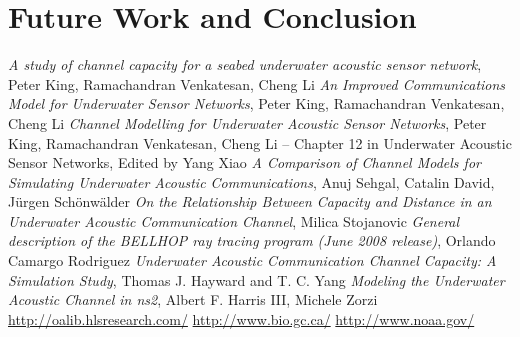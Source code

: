 \documentclass[a4paper]{IEEEtran}
\begin{document}
\section{Future Work and Conclusion}

\begin{thebibliography}{99}
 \textit{A study of channel capacity for a seabed underwater
acoustic sensor network}, Peter King, Ramachandran Venkatesan, Cheng Li
 \textit{An Improved Communications Model for Underwater Sensor
Networks}, Peter King, Ramachandran Venkatesan, Cheng Li
 \textit{Channel Modelling for Underwater Acoustic Sensor
Networks}, Peter King, Ramachandran Venkatesan, Cheng Li -- Chapter 12 in
Underwater Acoustic Sensor Networks, Edited by Yang Xiao
 \textit{A Comparison of Channel Models for Simulating Underwater
Acoustic Communications}, Anuj Sehgal, Catalin David, J\"urgen Sch\"onw\"alder
 \textit{On the Relationship Between Capacity and Distance
in an Underwater Acoustic Communication Channel}, Milica Stojanovic
 \textit{General description of the BELLHOP ray tracing program
(June 2008 release)}, Orlando Camargo Rodriguez
 \textit{Underwater Acoustic Communication Channel Capacity: A
Simulation Study}, Thomas J. Hayward and T. C. Yang
 \textit{Modeling the Underwater Acoustic Channel in ns2}, Albert
F. Harris III, Michele Zorzi 
 \url{http://oalib.hlsresearch.com/}
 \url{http://www.bio.gc.ca/}
 \url{http://www.noaa.gov/}
\end{thebibliography}
\end{document}
